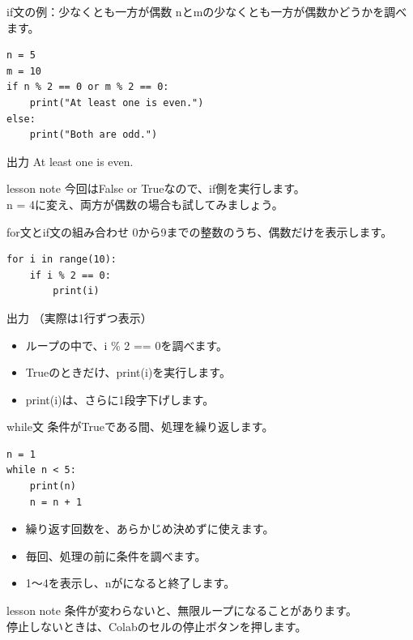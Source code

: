 \documentclass[12pt,aspectratio=43]{beamer}
\newcommand{\code}[1]{{\codefont #1}}
\newcommand{\result}[1]{%
  \par\vspace{1mm}%
  {\small\textcolor{black!60}{出力}}\quad
  {\codefont\fontsize{16}{18}\selectfont #1}\par}
\newenvironment{lessonbox}
  {\begin{beamercolorbox}[wd=\linewidth,sep=1.5mm]{lesson note}}
  {\end{beamercolorbox}\par}
\begin{document}
\begin{frame}[t,fragile]{if文の例：少なくとも一方が偶数}
  \setlength{\parskip}{0pt}
  \code{n}と\code{m}の少なくとも一方が偶数かどうかを調べます。
\begin{lstlisting}
n = 5
m = 10
if n % 2 == 0 or m % 2 == 0:
    print("At least one is even.")
else:
    print("Both are odd.")
\end{lstlisting}
  \result{At least one is even.}
  \vspace{2mm}
  \begin{lessonbox}
    \small 今回は\code{False or True}なので、\code{if}側を実行します。\\
    \code{n = 4}に変え、両方が偶数の場合も試してみましょう。
  \end{lessonbox}
\end{frame}

\begin{frame}[t,fragile]{for文とif文の組み合わせ}
  \setlength{\parskip}{0pt}
  0から9までの整数のうち、偶数だけを表示します。
  \par\vspace{2mm}
\begin{lstlisting}
for i in range(10):
    if i % 2 == 0:
        print(i)
\end{lstlisting}
  \result{0\quad
    {\normalfont\small （実際は1行ずつ表示）}}
  \vspace{3mm}
  \begin{itemize}
    \setlength{\itemsep}{2mm}
    \item ループの中で、\code{i \% 2 == 0}を調べます。
    \item \code{True}のときだけ、\code{print(i)}を実行します。
    \item \code{print(i)}は、さらに1段字下げします。
  \end{itemize}
\end{frame}

\begin{frame}[t,fragile]{while文}
  \setlength{\parskip}{0pt}
  条件が\code{True}である間、処理を繰り返します。
\begin{lstlisting}
n = 1
while n < 5:
    print(n)
    n = n + 1
\end{lstlisting}
  \begin{itemize}
    \setlength{\itemsep}{1.5mm}
    \item 繰り返す回数を、あらかじめ決めずに使えます。
    \item 毎回、処理の前に条件を調べます。
    \item 1〜4を表示し、\code{n}が\code{5}になると終了します。
  \end{itemize}
  \vspace{1mm}
  \begin{lessonbox}
    \small 条件が変わらないと、無限ループになることがあります。\\
    停止しないときは、Colabのセルの停止ボタンを押します。
  \end{lessonbox}
\end{frame}
\end{document}
